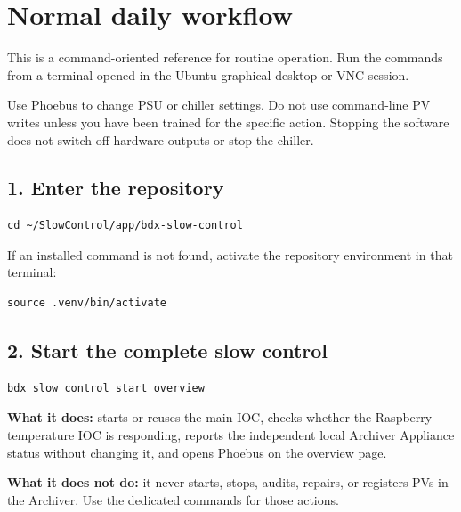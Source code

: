 \documentclass[11pt]{article}
\begin{document}
\hypersetup{pageanchor=false}
\makemanualtitle
\hypersetup{pageanchor=true}

\section{Normal daily workflow}

This is a command-oriented reference for routine operation. Run the commands from a terminal opened in the Ubuntu graphical desktop or VNC session.

\begin{warningbox}
Use Phoebus to change PSU or chiller settings. Do not use command-line PV writes unless you have been trained for the specific action. Stopping the software does not switch off hardware outputs or stop the chiller.
\end{warningbox}

\subsection*{1. Enter the repository}

\begin{lstlisting}[style=shell]
cd ~/SlowControl/app/bdx-slow-control
\end{lstlisting}

If an installed command is not found, activate the repository environment in that terminal:

\begin{lstlisting}[style=shell]
source .venv/bin/activate
\end{lstlisting}

\subsection*{2. Start the complete slow control}

\begin{lstlisting}[style=shell]
bdx_slow_control_start overview
\end{lstlisting}

\textbf{What it does:} starts or reuses the main IOC, checks whether the Raspberry temperature IOC is responding, reports the independent local Archiver Appliance status without changing it, and opens Phoebus on the overview page.

\textbf{What it does not do:} it never starts, stops, audits, repairs, or registers PVs in the Archiver. Use the dedicated  commands for those actions.
\end{document}
